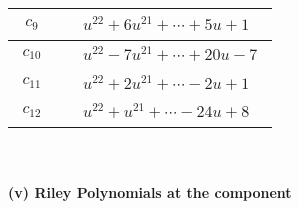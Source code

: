 \documentclass[1p]{elsarticle_modified}
\theoremstyle{definition}
\begin{document}
\begin{tabular}{m{50pt}|m{274pt}}
\hline $$\begin{aligned}c_{9}\end{aligned}$$&$\begin{aligned}
&u^{22}+6 u^{21}+\cdots+5 u+1
\end{aligned}$\\
\hline $$\begin{aligned}c_{10}\end{aligned}$$&$\begin{aligned}
&u^{22}-7 u^{21}+\cdots+20 u-7
\end{aligned}$\\
\hline $$\begin{aligned}c_{11}\end{aligned}$$&$\begin{aligned}
&u^{22}+2 u^{21}+\cdots-2 u+1
\end{aligned}$\\
\hline $$\begin{aligned}c_{12}\end{aligned}$$&$\begin{aligned}
&u^{22}+u^{21}+\cdots-24 u+8
\end{aligned}$\\
\hline
\end{tabular}\\~\\
\newpage\renewcommand{\arraystretch}{1}
\flushleft \textbf{(v) Riley Polynomials at the component}\newline \\
\end{document}
